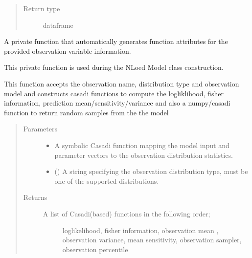 \documentclass[letterpaper,10pt,english,openany,oneside]{sphinxmanual}
\begin{document}
\begin{fulllineitems}
\begin{fulllineitems}
\begin{quote}
\begin{description}
\item[{Return type}] \leavevmode
dataframe

\end{description}\end{quote}

\end{fulllineitems}


\begin{fulllineitems}
\label{\detokenize{nloed:nloed.model.Model.__get_distribution_functions}}
A private function that automatically generates function attributes for the provided
observation variable information.

This private function is used during the NLoed Model class construction.

This function accepts the observation name, distribution type
and observation model and constructs casadi functions to compute
the logliklihood, fisher information, prediction mean/sensitivity/variance
and also a numpy/casadi function to return random samples from the the model
\begin{quote}\begin{description}
\item[{Parameters}] \leavevmode\begin{itemize}
\item {} 
 \textendash{} A symbolic Casadi function mapping the model input and parameter vectors
to the observation distribution statistics.

\item {} 
 () \textendash{} A string specifying the observation distribution type,
must be one of the supported distributions.

\end{itemize}

\item[{Returns}] \leavevmode
\begin{description}
\item[{A list of Casadi(\sphinxhyphen{}based) functions in the following order;}] \leavevmode
loglikelihood, fisher information, observation mean , observation variance,
mean sensitivity, observation sampler, observation percentile


\end{description}
\end{description}
\end{quote}
\end{fulllineitems}
\end{fulllineitems}
\end{document}
